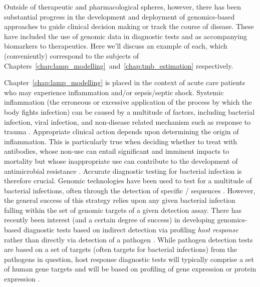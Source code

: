 \documentclass[thesis.tex]{subfiles}
\begin{document}
Outside of therapeutic and pharmacological spheres, however, there has been substantial progress in the development and deployment of genomics-based approaches to guide clinical decision making or track the course of disease. These have included the use of genomic data in diagnostic tests and as accompanying biomarkers to therapeutics. Here we'll discuss an example of each, which (conveniently) correspond to the subjects of Chapters~\ref{chap:lamp_modelling}~and~\ref{chap:tmb_estimation} respectively. 

Chapter~\ref{chap:lamp_modelling} is placed in the context of acute care patients who may experience inflammation and/or sepsis/septic shock. Systemic inflammation (the erroneous or excessive application of the process by which the body fights infection) can be caused by a multitude of factors, including bacterial infection, viral infection, and non-disease related mechanism such as response to trauma \citep{chen_inflammatory_2017}. Appropriate clinical action depends upon determining the origin of inflammation. This is particularly true when deciding whether to treat with antibodies, whose non-use can entail significant and imminent impacts to mortality \citep{liu_timing_2017} but whose inappropriate use can contribute to the development of antimicrobial resistance \citep{fitzpatrick_sepsis_2019}. Accurate diagnostic testing for bacterial infection is therefore crucial. Genomic technologies have been used to test for a multitude of bacterial infections, often through the detection of specific / sequences \citep{fournier_clinical_2014}. However, the general success of this strategy relies upon any given bacterial infection falling within the set of genomic targets of a given detection assay. There has recently been interest (and a certain degree of success) in developing genomics-based diagnostic tests based on indirect detection via profiling \emph{host response} rather than directly via detection of a pathogen \citep{safarika_29-mrna_2021, kelly_systematic_2022}. While pathogen detection tests are based on a set of targets (often  targets for bacterial infections) from the pathogens in question, host response diagnostic tests will typically comprise a set of human gene targets and will be based on profiling of gene expression \citep{ram-mohan_using_2022} or protein expression \citep{vanderboom_proteomic_2021}.
\end{document}
